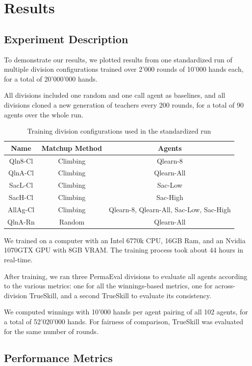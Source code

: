 \chapter{Results}
\label{Results}
\section{Experiment Description}
To demonstrate our results, we plotted results from one standardized run of multiple division configurations trained over 2'000 rounds of 10'000 hands each, for a total of 20'000'000 hands.

All divisions included one random and one call agent as baselines, and all divisions cloned a new generation of teachers every 200 rounds, for a total of 90 agents over the whole run.

\begin{table}[h!]
\centering
\begin{tabular}{|| c | c | c ||} 
 \hline
 Name & Matchup Method & Agents \\ [0.5ex] 
 \hline\hline
 Qln8-Cl & Climbing & Qlearn-8 \\
 QlnA-Cl & Climbing & Qlearn-All \\
 SacL-Cl & Climbing & Sac-Low \\
 SacH-Cl & Climbing & Sac-High \\
 AllAg-Cl & Climbing & Qlearn-8, Qlearn-All, Sac-Low, Sac-High \\
 QlnA-Rn & Random & Qlearn-All \\ [1ex] 
 \hline
\end{tabular}
\caption{Training division configurations used in the standardized run}
\label{RunDivisions}
\end{table}

We trained on a computer with an Intel 6770k CPU, 16GB Ram, and an Nvidia 1070GTX GPU with 8GB VRAM. The training process took about 44 hours in real-time.

After training, we ran three PermaEval divisions to evaluate all agents according to the various metrics: one for all the winnings-based metrics, one for across-division TrueSkill, and a second TrueSkill to evaluate its consistency.

We computed winnings with 10'000 hands per agent pairing of all 102 agents, for a total of 52'020'000 hands. For fairness of comparison, TrueSkill was evaluated for the same number of rounds.

\section{Performance Metrics}

